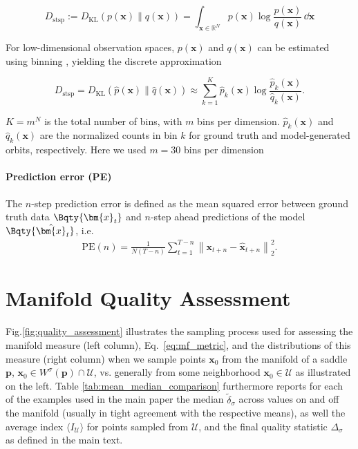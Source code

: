 \documentclass{article}
\theoremstyle{example}
\theoremstyle{plain}
\theoremstyle{definition}
\theoremstyle{remark}
\def\eqref#1{equation~\ref{#1}}
\def\vx{{\bm{x}}}
\renewcommand{\eqref}[1]{Eq.~\ref{#1}}
\newcommand\norm[1]{\left\lVert#1\right\rVert}
\begin{document}
\begin{equation}
D_{\text{stsp}} := D_{\text{KL}}(p(\vx) \parallel q(\vx)) = \int_{\mathbf{\vx} \in \mathbb{R}^N} p(\vx) \log \frac{p(\vx)}{q(\vx)} \, \dd \vx
\end{equation}

For low-dimensional observation spaces, \( p(\vx) \) and \( q(\vx) \) can be estimated using binning \citep{koppe2019recurrent,brenner_tractable_2022}, yielding the discrete approximation 

\begin{equation}
D_{\text{stsp}} = D_{\text{KL}}(\hat{p}(\vx) \parallel \hat{q}(\vx)) \approx \sum_{k=1}^K \hat{p}_k(\vx) \log \frac{\hat{p}_k(\vx)}{\hat{q}_k(\vx)}.
\end{equation}

\( K = m^N \) is the total number of bins, with \( m \) bins per dimension. \( \hat{p}_k(\vx) \) and \( \hat{q}_k(\vx) \) are the normalized counts in bin \( k \) for ground truth and model-generated orbits, respectively. Here we used $m=30$ bins per dimension%
\newline
\paragraph{Prediction error (PE)}
The $n$-step prediction error is defined as the mean squared error between ground truth data $\Bqty{\vx_t}$ and $n$-step ahead predictions of the model $\Bqty{\hat{\vx}_t}$, i.e.
\begin{align}
    \textrm{PE}(n) = \frac{1}{N(T-n)} \sum_{t=1}^{T-n} \norm{\vx_{t+n} - \hat{\vx}_{t+n}}_2^2 . 
\end{align}

\section{Manifold Quality Assessment}
\label{app:man}
Fig.\ref{fig:quality_assessment} illustrates the sampling process used for assessing the manifold measure (left column), \eqref{eq:mf_metric}, and the distributions of this measure (right column) when we sample points $\bm{x}_0$ from the manifold of a saddle $\bm{p}$, $\bm{x}_0 \in W^{\sigma}(\bm{p}) \cap \mathcal{U}$, vs. generally from some neighborhood $\bm{x}_0 \in \mathcal{U}$ as illustrated on the left. Table \ref{tab:mean_median_comparison} furthermore reports for each of the examples used in the main paper the median $\tilde{\delta}_{\sigma}$ across values on and off the manifold (usually in tight agreement with the respective means), as well the average index $\langle I_\mathcal{U} \rangle$ for points sampled from $\mathcal{U}$, and the final quality statistic $\Delta_{\sigma}$ as defined in the main text. 
\end{document}
